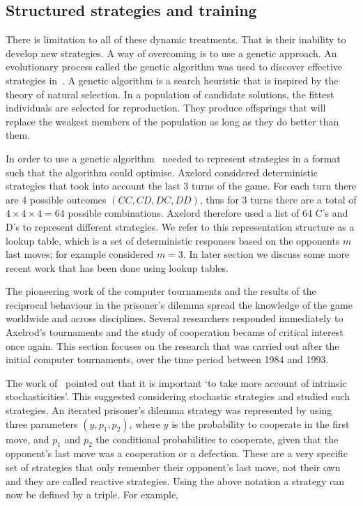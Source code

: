 \documentclass{article}
\theoremstyle{definition}
\begin{document}
\subsection{Structured strategies and training}
\label{section:responses_to_computer_tournament}

There is limitation to all of these  dynamic treatments. That is their inability
to develop new strategies. A way of overcoming  is to use a genetic approach.
An evolutionary process called the genetic algorithm was used to discover
effective strategies in~\cite{Axelrod1987}. A genetic algorithm is a search heuristic
that is inspired by the theory of natural selection. In a population of candidate
solutions, the fittest individuals are selected for reproduction. They
produce offsprings that will replace the weakest members of the population as long
as they do better than them.

In order to use a genetic algorithm~\cite{Axelrod1987} needed to represent strategies
in a format such that the algorithm could optimise. Axelord considered deterministic
strategies that took into account the last 3 turns of the game. For each turn
there are 4 possible outcomes \((CC, CD, DC, DD)\), thus for 3 turns there are a total
of \(4\times4\times4=64\) possible combinations. Axelord therefore used a list of 64 C's and D's
to represent different strategies. We refer to this representation structure as a
lookup table, which is a set of deterministic responses based on
the opponents \(m\) last moves; for example \cite{Axelrod1987} considered \(m=3\).
In later section we discuss some more recent work that has been done using lookup
tables.

The pioneering work of the computer tournaments and the results of the reciprocal behaviour
in the prisoner's dilemma spread the knowledge of the game worldwide and across
disciplines. Several researchers responded immediately to Axelrod's tournaments
and the study of cooperation became of critical interest once again.
This section focuses on the research that was carried out after the initial
computer tournaments, over the time period between 1984 and 1993.

The work of~\cite{May1987} pointed out that it is important `to take more account of intrinsic
stochasticities'. This suggested considering stochastic strategies and
\cite{nowak1989} studied such strategies. An iterated prisoner's dilemma strategy
was represented by using three parameters \((y, p_1, p_2)\), where \(y\) is the
probability to cooperate in the first move, and \(p_1\) and \(p_2\) the conditional probabilities
to cooperate, given that the opponent's last move was a cooperation or a defection.
These are a very specific set of strategies that only remember their
opponent's last move, not their own and they are called reactive strategies.
Using the above notation a strategy can now be defined by a triple. For example,
\end{document}
